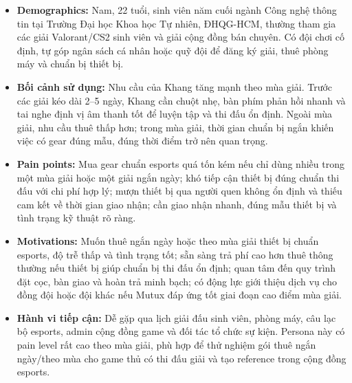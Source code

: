 \begin{itemize}
    \item \textbf{Demographics:} Nam, 22 tuổi, sinh viên năm cuối ngành Công nghệ thông tin tại Trường Đại học Khoa học Tự nhiên, ĐHQG-HCM, thường tham gia các giải Valorant/CS2 sinh viên và giải cộng đồng bán chuyên. Có đội chơi cố định, tự góp ngân sách cá nhân hoặc quỹ đội để đăng ký giải, thuê phòng máy và chuẩn bị thiết bị.
    \item \textbf{Bối cảnh sử dụng:} Nhu cầu của Khang tăng mạnh theo mùa giải. Trước các giải kéo dài 2--5 ngày, Khang cần chuột nhẹ, bàn phím phản hồi nhanh và tai nghe định vị âm thanh tốt để luyện tập và thi đấu ổn định. Ngoài mùa giải, nhu cầu thuê thấp hơn; trong mùa giải, thời gian chuẩn bị ngắn khiến việc có gear đúng mẫu, đúng thời điểm trở nên quan trọng.
    \item \textbf{Pain points:} Mua gear chuẩn esports quá tốn kém nếu chỉ dùng nhiều trong một mùa giải hoặc một giải ngắn ngày; khó tiếp cận thiết bị đúng chuẩn thi đấu với chi phí hợp lý; mượn thiết bị qua người quen không ổn định và thiếu cam kết về thời gian giao nhận; cần giao nhận nhanh, đúng mẫu thiết bị và tình trạng kỹ thuật rõ ràng.
    \item \textbf{Motivations:} Muốn thuê ngắn ngày hoặc theo mùa giải thiết bị chuẩn esports, độ trễ thấp và tình trạng tốt; sẵn sàng trả phí cao hơn thuê thông thường nếu thiết bị giúp chuẩn bị thi đấu ổn định; quan tâm đến quy trình đặt cọc, bàn giao và hoàn trả minh bạch; có động lực giới thiệu dịch vụ cho đồng đội hoặc đội khác nếu Mutux đáp ứng tốt giai đoạn cao điểm mùa giải.
    \item \textbf{Hành vi tiếp cận:} Dễ gặp qua lịch giải đấu sinh viên, phòng máy, câu lạc bộ esports, admin cộng đồng game và đối tác tổ chức sự kiện. Persona này có pain level rất cao theo mùa giải, phù hợp để \projectname{} thử nghiệm gói thuê ngắn ngày/theo mùa cho game thủ có thi đấu giải và tạo reference trong cộng đồng esports.
\end{itemize}

